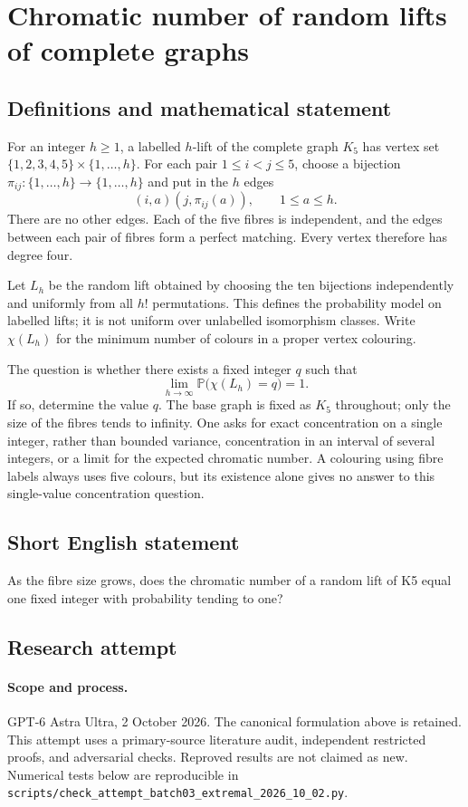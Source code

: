 \documentclass[11pt,a4paper]{article}
\begin{document}
\section*{Chromatic number of random lifts of complete graphs}\label{statement}

\subsection{Definitions and mathematical statement}
For an integer $h\ge1$, a labelled $h$-lift of the complete graph $K_5$
has vertex set $\{1,2,3,4,5\}\times\{1,\ldots,h\}$. For each pair
$1\le i<j\le5$, choose a bijection
$\pi_{ij}:\{1,\ldots,h\}\to\{1,\ldots,h\}$ and put in the $h$ edges
\[
                       (i,a)(j,\pi_{ij}(a)),\qquad 1\le a\le h.
\]
There are no other edges. Each of the five fibres is independent,
and the edges between each pair of fibres form a perfect matching.
Every vertex therefore has degree four.

Let $L_h$ be the random lift obtained by choosing the ten bijections
independently and uniformly from all $h!$ permutations. This defines
the probability model on labelled lifts; it is not uniform over
unlabelled isomorphism classes. Write $\chi(L_h)$ for the minimum
number of colours in a proper vertex colouring.

The question is whether there exists a fixed integer $q$ such that
\[
                     \lim_{h\to\infty}
                     \mathbb P\bigl(\chi(L_h)=q\bigr)=1.
\]
If so, determine the value $q$. The base graph is fixed as $K_5$
throughout; only the size of the fibres tends to infinity. One asks
for exact concentration on a single integer, rather than bounded
variance, concentration in an interval of several integers, or a
limit for the expected chromatic number. A colouring using fibre
labels always uses five colours, but its existence alone gives no
answer to this single-value concentration question.
\subsection{Short English statement}
As the fibre size grows, does the chromatic number of a random lift of K5 equal one fixed integer with probability tending to one?
\subsection{Research attempt}
\paragraph{Scope and process.}
GPT-6 Astra Ultra, 2 October 2026. The canonical formulation above is retained. This attempt uses a primary-source literature audit, independent restricted proofs, and adversarial checks. Reproved results are not claimed as new. Numerical tests below are reproducible in \texttt{scripts/check\_attempt\_batch03\_extremal\_2026\_10\_02.py}.
\end{document}
